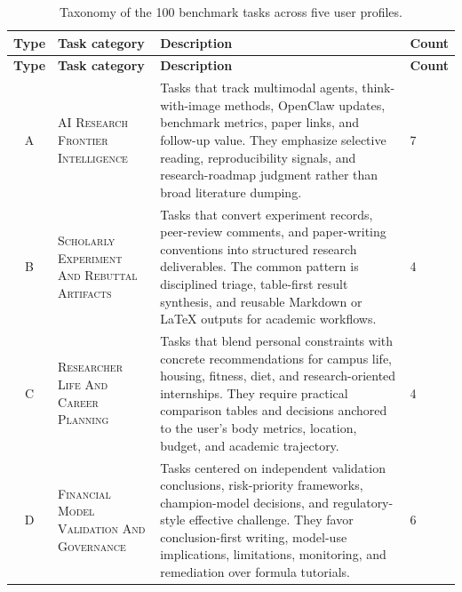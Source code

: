 { %
\scriptsize
\begin{longtable}{cp{}p{}p{}}

\caption{Taxonomy of the 100 benchmark tasks across five user profiles.}
\label{tab:task_taxonomy} \\
\toprule[1.25pt]
\textbf{Type} & \textbf{Task category} & \textbf{Description} & \textbf{Count} \\
\midrule[0.75pt]
\endfirsthead

\toprule[1.25pt]
\textbf{Type} & \textbf{Task category} & \textbf{Description} & \textbf{Count} \\
\midrule[0.75pt]
\endhead

\endfoot

\bottomrule[1.25pt]
\endlastfoot

A &
\textsc{AI Research Frontier Intelligence} &
Tasks that track multimodal agents, think-with-image methods, OpenClaw updates, benchmark metrics, paper links, and follow-up value. They emphasize selective reading, reproducibility signals, and research-roadmap judgment rather than broad literature dumping. &
7 \\
\midrule[0.75pt]

B &
\textsc{Scholarly Experiment And Rebuttal Artifacts} &
Tasks that convert experiment records, peer-review comments, and paper-writing conventions into structured research deliverables. The common pattern is disciplined triage, table-first result synthesis, and reusable Markdown or LaTeX outputs for academic workflows. &
4 \\
\midrule[0.75pt]

C &
\textsc{Researcher Life And Career Planning} &
Tasks that blend personal constraints with concrete recommendations for campus life, housing, fitness, diet, and research-oriented internships. They require practical comparison tables and decisions anchored to the user's body metrics, location, budget, and academic trajectory. &
4 \\
\midrule[0.75pt]

D &
\textsc{Financial Model Validation And Governance} &
Tasks centered on independent validation conclusions, risk-priority frameworks, champion-model decisions, and regulatory-style effective challenge. They favor conclusion-first writing, model-use implications, limitations, monitoring, and remediation over formula tutorials. &
6 \\
\midrule[0.75pt]


\end{longtable}}
